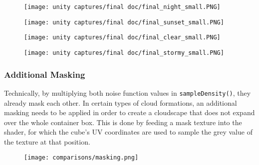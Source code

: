 \begin{figure}[H]
    \centering
        \begin{minipage}{0.47\linewidth}
            \texttt{[image: unity captures/final doc/final\_night\_small.PNG]}
            \label{img:captures:prototype_final:night}
        \end{minipage}
    \hfill
        \begin{minipage}{0.47\linewidth}
            \texttt{[image: unity captures/final doc/final\_sunset\_small.PNG]}
            \label{img:captures:prototype_final:sunset}
        \end{minipage}
\end{figure}

\begin{figure}[H]
    \centering
        \begin{minipage}{0.47\linewidth}
            \texttt{[image: unity captures/final doc/final\_clear\_small.PNG]}
            \label{img:captures:prototype_final:clear}
        \end{minipage}
    \hfill
        \begin{minipage}{0.47\linewidth}
            \texttt{[image: unity captures/final doc/final\_stormy\_small.PNG]}
            \label{img:captures:prototype_final:stormy}
        \end{minipage}
\end{figure}

\clearpage
\subsubsection{Additional Masking}
Technically, by multiplying both noise function values in \lstinline[language=HLSL]{sampleDensity()}, they already mask each other. In certain types of cloud formations, an additional masking needs to be applied in order to create a cloudscape that does not expand over the whole container box.
This is done by feeding a mask texture into the shader, for which the cube's UV coordinates are used to sample the grey value of the texture at that position.

\begin{figure}[H]
    \centering
    \texttt{[image: comparisons/masking.png]}
    \label{img:camparisons:masking}
\end{figure}

